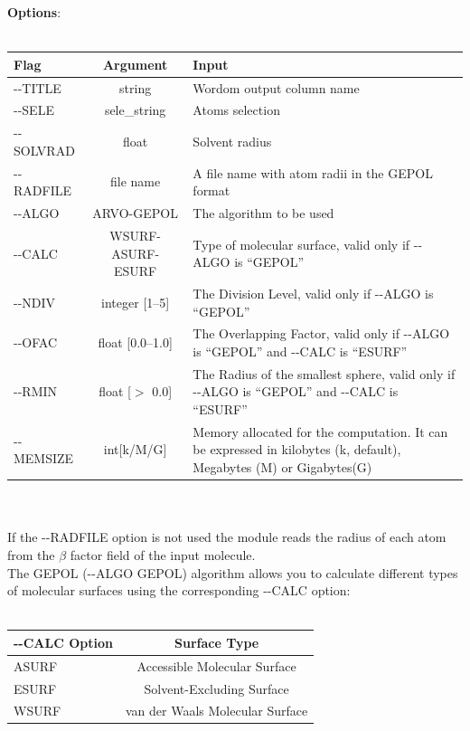 \documentclass[11pt,twoside,onecolumn,a4paper,openright,notitlepage]{book}[2001/04/21]
\begin{document}
\textbf{\large Options}:\\\\
\begin{tabular}{l|c|p{7.0cm}}
Flag & Argument & Input \\
\hline
-{}-TITLE         & string                        & Wordom output column name\\
-{}-SELE          & sele\_string                  & Atoms selection\\
-{}-SOLVRAD       & float                         & Solvent radius\\
-{}-RADFILE       & file name                     & A file name with atom radii in the GEPOL format\\
-{}-ALGO          & ARVO-GEPOL                    & The algorithm to be used\\
-{}-CALC          & WSURF-ASURF-ESURF             & Type of molecular surface, valid only if -{}-ALGO is ``GEPOL''\\
-{}-NDIV          & integer [1--5]                & The Division Level, valid only if -{}-ALGO is ``GEPOL''\\
-{}-OFAC          & float [0.0--1.0]              & The Overlapping Factor, valid only if -{}-ALGO is ``GEPOL'' and -{}-CALC is ``ESURF''\\
-{}-RMIN          & float [$>$ 0.0]               & The Radius of the smallest sphere, valid only if -{}-ALGO is ``GEPOL'' and -{}-CALC is ``ESURF''\\
-{}-MEMSIZE       & int[k/M/G]                    & Memory allocated for the computation. It can be expressed in kilobytes (k, default), Megabytes (M) or Gigabytes(G)\\
\end{tabular}\\\\

If the -{}-RADFILE option is not used the module reads the radius of each atom from the $\beta{}$ factor field of the input molecule.\\
The GEPOL (-{}-ALGO GEPOL) algorithm allows you to calculate different types of molecular surfaces using the corresponding -{}-CALC option:\\\\
\begin{tabular}{l|c}
-{}-CALC Option & Surface Type \\
\hline
ASURF & Accessible Molecular Surface\\
ESURF & Solvent-Excluding Surface\\
WSURF & van der Waals Molecular Surface\\
\end{tabular}\\\\
\end{document}
